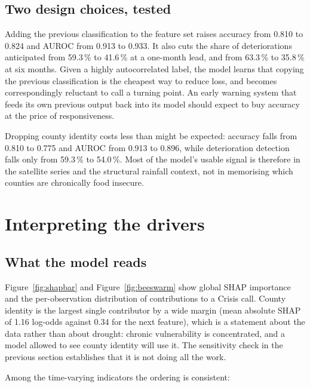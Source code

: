 \documentclass[11pt]{article}
\begin{document}
\subsection{Two design choices, tested}

Adding the previous classification to the feature set raises accuracy from 0.810
to 0.824 and AUROC from 0.913 to 0.933. It also cuts the share of deteriorations
anticipated from 59.3\,\% to 41.6\,\% at a one-month lead, and from 63.3\,\% to
35.8\,\% at six months. Given a highly autocorrelated label, the model learns
that copying the previous classification is the cheapest way to reduce loss, and
becomes correspondingly reluctant to call a turning point. An early warning
system that feeds its own previous output back into its model should expect to
buy accuracy at the price of responsiveness.

Dropping county identity costs less than might be expected: accuracy falls from
0.810 to 0.775 and AUROC from 0.913 to 0.896, while deterioration detection
falls only from 59.3\,\% to 54.0\,\%. Most of the model's usable signal is
therefore in the satellite series and the structural rainfall context, not in
memorising which counties are chronically food insecure.

\section{Interpreting the drivers}
\label{sec:drivers}

\subsection{What the model reads}

Figure~\ref{fig:shapbar} and Figure~\ref{fig:beeswarm} show global SHAP
importance and the per-observation distribution of contributions to a Crisis
call. County identity is the largest single contributor by a wide margin (mean
absolute SHAP of 1.16 log-odds against 0.34 for the next feature), which is a
statement about the data rather than about drought: chronic vulnerability is
concentrated, and a model allowed to see county identity will use it. The
sensitivity check in the previous section establishes that it is not doing all
the work.

Among the time-varying indicators the ordering is consistent:
\end{document}
